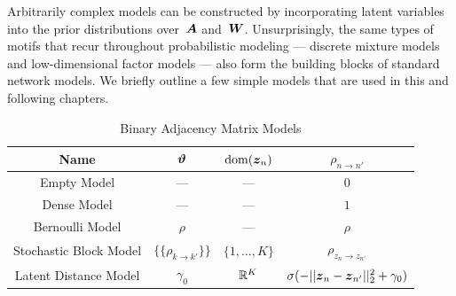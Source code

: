 Arbitrarily complex models can be constructed by incorporating latent
variables into the prior distributions over~$\boldsymbol{A}$ and~$\boldsymbol{W}$.
Unsurprisingly, the same types of motifs that recur throughout
probabilistic modeling --- discrete mixture models and low-dimensional
factor models --- also form the building blocks of
standard network models.  We briefly outline a few simple models that
are used in this and following chapters.


\begin{table}
\begin{center}
\begin{tabular}{c|c|c|c}
Name & $\boldsymbol{\vartheta}$ & $\mathrm{dom}(\boldsymbol{z}_n)$ & $\rho_{n \to n'}$ \\
\hline
Empty Model & --- &  --- & $0$ \\
Dense Model & --- & --- & $1$ \\
Bernoulli Model & $\rho$ & --- & $\rho$ \\
Stochastic Block Model & $\{\{\rho_{k \to k'}\}\}$ & $\{1, \ldots, K\}$ & $\rho_{z_n \to z_{n'}}$ \\
Latent Distance Model & $\gamma_0$ & $\mathbb{R}^K$ & $\sigma(-||\boldsymbol{z}_n - \boldsymbol{z}_{n'}||_2^2 + \gamma_0)$
\end{tabular}
\end{center}
\caption{Binary Adjacency Matrix Models}
\label{tab:A_models}
\end{table}

